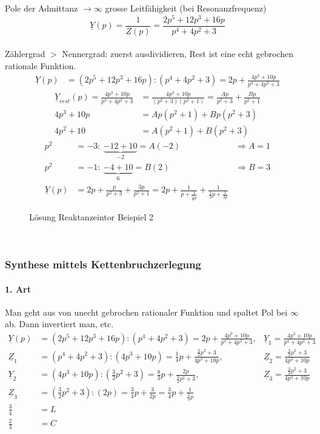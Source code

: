 Pole der Admittanz $\rightarrow \infty$ grosse Leitfähigkeit (bei
Resonanzfrequenz)\\
$$\underline{Y}(p)=\frac{1}{\underline{Z}(p)}=\frac{2p^5+12p^3+16p}{p^4+4p^2+3}$$\\
Zählergrad $>$ Nennergrad: zuerst ausdividieren, Rest ist eine echt gebrochen
rationale Funktion.\\
\begin{align}
\underline{Y}(p)&=(2p^5+12p^3+16p):(p^4+4p^2+3)=2p+\frac{4p^3+10p}{p^4+4p^2+3}\nonumber
\end{align}
\begin{align}
\underline{Y}_{rest}(p)=\frac{4p^3+10p}{p^4+4p^2+3}&=\frac{4p^3+10p}{(p^2+3)(p^2+1)}=\frac{Ap}{p^2+3}+\frac{Bp}{p^2+1}\nonumber\\
4p^3+10p&=Ap(p^2+1)+Bp(p^2+3)\nonumber\\
4p^2+10&=A(p^2+1)+B(p^2+3)\nonumber
\end{align}
\begin{align}
p^2&=-3:\ \underbrace{-12+10}_{-2}=A(-2) &\Rightarrow A=1\nonumber\\
p^2&=-1:\ \underbrace{-4+10}_{6}=B(2) &\Rightarrow B=3\nonumber\\
\underline{Y}(p)&=2p+\frac{p}{p^2+3}+\frac{3p}{p^2+1}=2p+\frac{1}{p+\frac{1}{\frac{1}{3}p}}+\frac{1}{\frac{1}{3}p+\frac{1}{3p}}\nonumber
\end{align}
\begin{figure}[!h]
	\centering
	
	\caption{Lösung Reaktanzeintor Beispiel 2}
	\label{fig:RetSyntheseBsp2L}
\end{figure}\\


\subsubsection{Synthese mittels Kettenbruchzerlegung}
\paragraph{1. Art}
Man geht aus von unecht gebrochen rationaler Funktion und
spaltet Pol bei $\infty$ ab. Dann invertiert man, etc.
\begin{align}
	\underline{Y}(p)&=(2p^5+12p^3+16p):(p^4+4p^2+3)=2p+\frac{4p^3+10p}{p^4+4p^2+3},
	&\underline{Y}_1=\frac{4p^3+10p}{p^4+4p^2+3}\nonumber\\
	\underline{Z}_1&=(p^4+4p^2+3):(4p^3+10p)=\frac{1}{4}p+\frac{\frac{3}{2}p^2+3}{4p^3+10p},
	&\underline{Z}_2=\frac{\frac{3}{2}p^2+3}{4p^3+10p}\nonumber\\
	\underline{Y}_2&=(4p^3+10p):(\frac{3}{2}p^2+3)=\frac{8}{3}p+\frac{2p}{\frac{3}{2}p^2+3},
	&\underline{Z}_3=\frac{\frac{3}{2}p^2+3}{4p^3+10p}\nonumber\\
	\underline{Z}_3&=(\frac{3}{2}p^2+3):(2p)=\frac{3}{4}p+\frac{3}{2p}=\frac{3}{4}p+\frac{1}{\frac{2}{3}p}\nonumber\\ \frac{3}{4}&=L\nonumber\\
	\frac{2}{3}&=C\nonumber
\end{align}